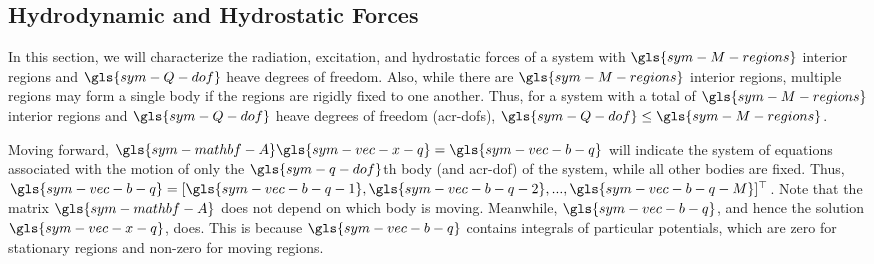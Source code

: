 \documentclass[ASNA,twocolumn]{USG} %
\begin{document}
\subsection{Hydrodynamic and Hydrostatic Forces}\label{jfm:sec:Hydrodynamic Forces}
In this section, we will characterize the radiation, excitation, and hydrostatic forces of a system with $\gls{sym-M-regions}$ interior regions and $\gls{sym-Q-dof}$ heave degrees of freedom.
Also, while there are $\gls{sym-M-regions}$ interior regions, multiple regions may form a single body if the regions are rigidly fixed to one another.
Thus, for a system with a total of $\gls{sym-M-regions}$ interior regions and $\gls{sym-Q-dof}$ heave degrees of freedom (\glspl{acr-dof}), $\gls{sym-Q-dof} \le \gls{sym-M-regions}$. 

Moving forward, $\gls{sym-mathbf-A} \gls{sym-vec-x-q} = \gls{sym-vec-b-q}$ will indicate the system of equations associated with the motion of only the $\gls{sym-q-dof}$th body (and \gls{acr-dof}) of the system, while all other bodies are fixed.
Thus, $\gls{sym-vec-b-q}=[\gls{sym-vec-b-q-1},\gls{sym-vec-b-q-2},...,\gls{sym-vec-b-q-M}]^{\top}$. Note that the matrix $\gls{sym-mathbf-A}$ does not depend on which body is moving.
Meanwhile, $\gls{sym-vec-b-q}$, and hence the solution $\gls{sym-vec-x-q}$, does.
This is because $\gls{sym-vec-b-q}$ contains integrals of particular potentials, which are zero for stationary regions and non-zero for moving regions.
\end{document}
